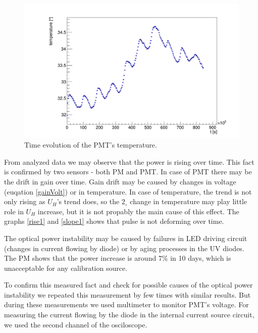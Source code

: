 \begin{figure}[H]
 \centering
 \includegraphics[scale=0.3]{./pictures/temperatures}
 \caption{Time evolution of the PMT's temperature.}
 \label{temp1}
\end{figure}

From analyzed data we may observe that the power is rising over time. This fact is confirmed by two sensors - both PM and PMT. In case of PMT there may be the drift in gain over time. Gain drift may be caused by changes in voltage (euqation \ref{gainVolt}) or in temperature. In case of temperature, the trend is not only rising as $U_{H}$'s trend does, so the $2_{\circ}$ change in temperature may play little role in $U_{H}$ increase, but it is not propably the main cause of this effect.
The graphs \ref{rise1} and \ref{slope1} shows that pulse is not deforming over time.
\par
The optical power instability may be caused by failures in LED driving circuit (changes in current flowing by diode) or by aging processes in the UV diodes. The PM shows that the power increase is around $7 \%$ in 10 days, which is unacceptable for any calibration source. 
\par
To confirm this measured fact and check for possible causes of the optical power instability we repeated this measurement by few times with similar results. But during these measurements we used multimeter to monitor PMT's voltage. For measuring the current flowing by the diode in the internal current source circuit, we used the second channel of the osciloscope.

